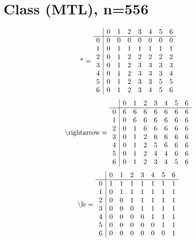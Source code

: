 \documentclass[11pt]{article}
\begin{document}
\section{Class (MTL), n=556}
\[\text{*} = 
\begin{array}{r | r r r r r r r}
 & 0 & 1 & 2 & 3 & 4 & 5 & 6 \\ \hline
0 & 0 & 0 & 0 & 0 & 0 & 0 & 0 \\
1 & 0 & 1 & 1 & 1 & 1 & 1 & 1 \\
2 & 0 & 1 & 2 & 2 & 2 & 2 & 2 \\
3 & 0 & 1 & 2 & 3 & 3 & 3 & 3 \\
4 & 0 & 1 & 2 & 3 & 3 & 3 & 4 \\
5 & 0 & 1 & 2 & 3 & 3 & 5 & 5 \\
6 & 0 & 1 & 2 & 3 & 4 & 5 & 6 \\
\end{array}
\]
\[\text{\textbackslash rightarrow} = 
\begin{array}{r | r r r r r r r}
 & 0 & 1 & 2 & 3 & 4 & 5 & 6 \\ \hline
0 & 6 & 6 & 6 & 6 & 6 & 6 & 6 \\
1 & 0 & 6 & 6 & 6 & 6 & 6 & 6 \\
2 & 0 & 1 & 6 & 6 & 6 & 6 & 6 \\
3 & 0 & 1 & 2 & 6 & 6 & 6 & 6 \\
4 & 0 & 1 & 2 & 5 & 6 & 6 & 6 \\
5 & 0 & 1 & 2 & 4 & 4 & 6 & 6 \\
6 & 0 & 1 & 2 & 3 & 4 & 5 & 6 \\
\end{array}
\]
\[\text{\textbackslash le} = 
\begin{array}{r | r r r r r r r}
 & 0 & 1 & 2 & 3 & 4 & 5 & 6 \\ \hline
0 & 1 & 1 & 1 & 1 & 1 & 1 & 1 \\
1 & 0 & 1 & 1 & 1 & 1 & 1 & 1 \\
2 & 0 & 0 & 1 & 1 & 1 & 1 & 1 \\
3 & 0 & 0 & 0 & 1 & 1 & 1 & 1 \\
4 & 0 & 0 & 0 & 0 & 1 & 1 & 1 \\
5 & 0 & 0 & 0 & 0 & 0 & 1 & 1 \\
6 & 0 & 0 & 0 & 0 & 0 & 0 & 1 \\
\end{array}
\]
\end{document}
